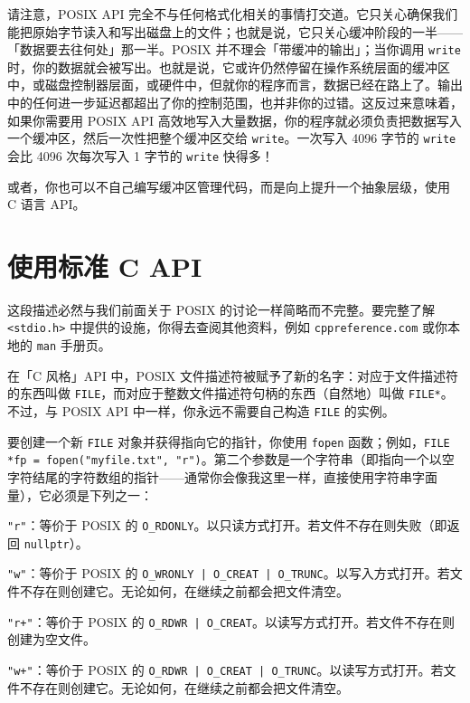 请注意，POSIX API 完全不与任何格式化相关的事情打交道。它只关心确保我们能把原始字节读入和写出磁盘上的文件；也就是说，它只关心缓冲阶段的一半——「数据要去往何处」那一半。POSIX 并不理会「带缓冲的输出」；当你调用 \texttt{write} 时，你的数据就会被写出。也就是说，它或许仍然停留在操作系统层面的缓冲区中，或磁盘控制器层面，或硬件中，但就你的程序而言，数据已经在路上了。输出中的任何进一步延迟都超出了你的控制范围，也并非你的过错。这反过来意味着，如果你需要用 POSIX API 高效地写入大量数据，你的程序就必须负责把数据写入一个缓冲区，然后一次性把整个缓冲区交给 \texttt{write}。一次写入 4096 字节的 \texttt{write} 会比 4096 次每次写入 1 字节的 \texttt{write} 快得多！

或者，你也可以不自己编写缓冲区管理代码，而是向上提升一个抽象层级，使用 C 语言 API。

\section{使用标准 C API}

这段描述必然与我们前面关于 POSIX 的讨论一样简略而不完整。要完整了解 \texttt{<stdio.\allowbreak{}h>\allowbreak{}} 中提供的设施，你得去查阅其他资料，例如 \texttt{cppreference.\allowbreak{}com} 或你本地的 \texttt{man} 手册页。

在「C 风格」API 中，POSIX 文件描述符被赋予了新的名字：对应于文件描述符的东西叫做 \texttt{FILE}，而对应于整数文件描述符句柄的东西（自然地）叫做 \texttt{FILE*}。不过，与 POSIX API 中一样，你永远不需要自己构造 \texttt{FILE} 的实例。

要创建一个新 \texttt{FILE} 对象并获得指向它的指针，你使用 \texttt{fopen} 函数；例如，\texttt{FILE *fp = fopen(\allowbreak{}"myfile.\allowbreak{}txt",\allowbreak{} "r")\allowbreak{}}。第二个参数是一个字符串（即指向一个以空字符结尾的字符数组的指针——通常你会像我这里一样，直接使用字符串字面量），它必须是下列之一：

\texttt{"r"}：等价于 POSIX 的 \texttt{O\_\allowbreak{}RDONLY}。以只读方式打开。若文件不存在则失败（即返回 \texttt{nullptr}）。

\texttt{"w"}：等价于 POSIX 的 \texttt{O\_\allowbreak{}WRONLY | O\_\allowbreak{}CREAT | O\_\allowbreak{}TRUNC}。以写入方式打开。若文件不存在则创建它。无论如何，在继续之前都会把文件清空。

\texttt{"r+"}：等价于 POSIX 的 \texttt{O\_\allowbreak{}RDWR | O\_\allowbreak{}CREAT}。以读写方式打开。若文件不存在则创建为空文件。

\texttt{"w+"}：等价于 POSIX 的 \texttt{O\_\allowbreak{}RDWR | O\_\allowbreak{}CREAT | O\_\allowbreak{}TRUNC}。以读写方式打开。若文件不存在则创建它。无论如何，在继续之前都会把文件清空。

